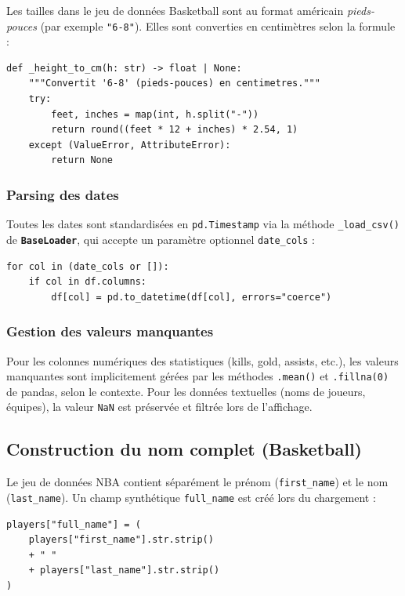 \documentclass[12pt,a4paper]{article}
\newcommand{\code}[1]{\texttt{#1}}
\newcommand{\classe}[1]{\texttt{\textbf{#1}}}
\begin{document}
Les tailles dans le jeu de données Basketball sont au format américain
\textit{pieds-pouces} (par exemple \code{"6-8"}). Elles sont converties en
centimètres selon la formule :

\begin{lstlisting}[caption={Conversion taille NBA (BasketballLoader.py)}]
def _height_to_cm(h: str) -> float | None:
    """Convertit '6-8' (pieds-pouces) en centimetres."""
    try:
        feet, inches = map(int, h.split("-"))
        return round((feet * 12 + inches) * 2.54, 1)
    except (ValueError, AttributeError):
        return None
\end{lstlisting}

\subsubsection{Parsing des dates}

Toutes les dates sont standardisées en \code{pd.Timestamp} via la méthode
\code{\_load\_csv()} de \classe{BaseLoader}, qui accepte un paramètre optionnel
\code{date\_cols} :

\begin{lstlisting}[caption={Parsing des dates dans BaseLoader.py}]
for col in (date_cols or []):
    if col in df.columns:
        df[col] = pd.to_datetime(df[col], errors="coerce")
\end{lstlisting}

\subsubsection{Gestion des valeurs manquantes}

Pour les colonnes numériques des statistiques (kills, gold, assists, etc.),
les valeurs manquantes sont implicitement gérées par les méthodes \code{.mean()}
et \code{.fillna(0)} de pandas, selon le contexte. Pour les données textuelles
(noms de joueurs, équipes), la valeur \code{NaN} est préservée et filtrée lors
de l'affichage.

\subsection{Construction du nom complet (Basketball)}

Le jeu de données NBA contient séparément le prénom (\code{first\_name}) et le
nom (\code{last\_name}). Un champ synthétique \code{full\_name} est créé lors du
chargement :

\begin{lstlisting}[caption={Création du full\_name (BasketballLoader.py)}]
players["full_name"] = (
    players["first_name"].str.strip()
    + " "
    + players["last_name"].str.strip()
)
\end{lstlisting}
\end{document}
